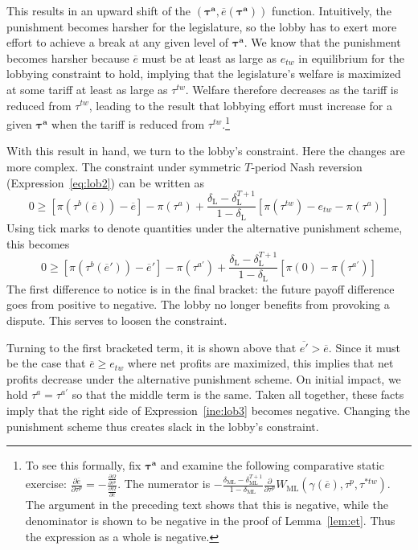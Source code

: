 \documentclass[authoryear, review]{elsarticle}
\newcommand{\ov}{\overline}
\newcommand{\bta}{\bm{\tau^a}}
\newcommand{\ga}{\gamma}
\newcommand{\de}{\delta}
\begin{document}
This results in an upward shift of the $\left(\bta,\ov{e}\left(\bta\right) \right)$ function. Intuitively, the punishment becomes harsher for the legislature, so the lobby has to exert more effort to achieve a break at any given level of $\bta$. We know that the punishment becomes harsher because $\ov{e}$ must be at least as large as $e_{tw}$ in equilibrium for the lobbying constraint to hold, implying that the legislature's welfare is maximized at some tariff at least as large as $\tau^{tw}$. Welfare therefore decreases as the tariff is reduced from $\tau^{tw}$, leading to the result that lobbying effort must increase for a given $\bta$ when the tariff is reduced from $\tau^{tw}$.\footnote{To see this formally, fix $\bta$ and examine the following comparative static exercise:
						$\frac{\partial \ov{e}}{\partial \tau^p} = -\frac{\frac{\partial \Omega}{\partial \tau^p}}{\frac{\partial \Omega}{\partial \ov{e}}}$. The numerator is $ -\frac{\de_\text{ML} - \de_\text{ML}^{T+1}}{1-\de_\text{ML}}\frac{\partial }{\partial \tau^p} W_{\text{ML}}(\ga(\ov{e}),\tau^p,\tau^{*tw})$. The argument in the preceding text shows that this is negative, while the denominator is shown to be negative in the proof of Lemma~\ref{lem:et}. Thus the expression as a whole is negative.}

With this result in hand, we turn to the lobby's constraint. Here the changes are more complex. The constraint under symmetric $T$-period Nash reversion (Expression~\ref{eq:lob2}) can be written as
	\[
	  0 \geq \left[\pi(\tau^b(\ov{e})) - \ov{e}\right] - \pi(\tau^a) + \frac{\de_\text{L} - \de_\text{L}^{T+1}}{1-\de_\text{L}} \left[\pi(\tau^{tw}) -e_{tw} - \pi(\tau^a) \right]
  \]
Using tick marks to denote quantities under the alternative punishment scheme, this becomes
				\begin{equation}
					0 \geq \left[\pi(\tau^b(\ov{e}')) - \ov{e}'\right] - \pi(\tau^{a'}) + \frac{\de_\text{L} - \de_\text{L}^{T+1}}{1-\de_\text{L}} \left[\pi(0) - \pi(\tau^{a'}) \right]
					\label{ine:lob3}
				\end{equation}
The first difference to notice is in the final bracket: the future payoff difference goes from positive to negative. The lobby no longer benefits from provoking a dispute. This serves to loosen the constraint.

Turning to the first bracketed term, it is shown above that $\ov{e'} > \ov{e}$. Since it must be the case that $\ov{e} \geq e_{tw}$ where net profits are maximized, this implies that net profits decrease under the alternative punishment scheme. On initial impact, we hold $\tau^a = \tau^{a'}$ so that the middle term is the same. Taken all together, these facts imply that the right side of Expression~\ref{ine:lob3} becomes negative. Changing the punishment scheme thus creates slack in the lobby's constraint.
\end{document}
